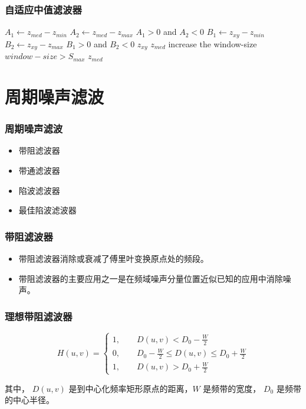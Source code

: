 \documentclass{beamer}
\begin{document}
\begin{frame}
\frametitle{自适应中值滤波器}
\label{sec-7-5}

 \begin{codebox}
 \zi      \Repeat
 \zi    $ A_1 \gets z_{med}-z_{min}$ 
 \zi    $ A_2 \gets z_{med}-z_{max}$ 
 \zi    \If  $A_1>0$ and  $A_2<0$ 
 \zi        \Then 
 \zi             $ B_1 \gets z_{xy}-z_{min}$ 
 \zi             $ B_2 \gets z_{xy}-z_{max}$ 
 \zi             \If  $B_1>0$ and  $ B_2<0$ 
 \zi               \Then \Return $z_{xy}$
 \zi               \Else \Return $z_{med}$
                 \End
 \zi        \Else increase the window-size
        \End  
 \zi \Until $window-size > S_{max}$ 
 \zi \Return $z_{med}$
 \end{codebox}
\end{frame}
\section{周期噪声滤波}
\label{sec-8}
\begin{frame}
\frametitle{周期噪声滤波}
\label{sec-8-1}

\begin{itemize}
\item 带阻滤波器
\item 带通滤波器
\item 陷波滤波器
\item 最佳陷波滤波器
\end{itemize}
\end{frame}
\begin{frame}
\frametitle{带阻滤波器}
\label{sec-8-2}

\begin{itemize}
\item 带阻滤波器消除或衰减了傅里叶变换原点处的频段。
\item 带阻滤波器的主要应用之一是在频域噪声分量位置近似已知的应用中消除噪声。
\end{itemize}
\end{frame}
\begin{frame}
\frametitle{理想带阻滤波器}
\label{sec-8-3}

\[ H(u,v)=
\begin{cases}
1, \qquad D(u,v)<D_0-\frac{W}{2} \\
0, \qquad D_0-\frac{W}{2} \leq D(u,v) \leq D_0+\frac{W}{2}\\
1, \qquad D(u,v)>D_0+\frac{W}{2}
\end{cases}
\]

其中， $D(u,v)$ 是到中心化频率矩形原点的距离，$W$ 是频带的宽度， $D_0$ 是频带的中心半径。
\end{frame}
\end{document}
